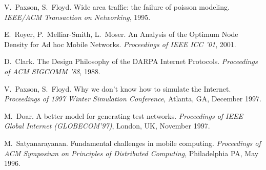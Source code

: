 \begin{thebibliography}{99}

V.~Paxson, S.~Floyd.
Wide area traffic: the failure of poisson modeling.
\textit{IEEE/ACM Transaction on Networking}, 1995.

E.~Royer, P.~Melliar-Smith, L.~Moser.
An Analysis of the Optimum Node Density for Ad hoc Mobile Networks.
\textit{Proceedings of IEEE ICC '01}, 2001.




D.~Clark.
The Design Philosophy of the DARPA Internet Protocols.
\textit{Proceedings of ACM SIGCOMM '88}, 1988.


V.~Paxson, S.~Floyd.
Why we don't know how to simulate the Internet.
\textit{Proceedings of 1997 Winter Simulation Conference}, Atlanta, GA, December 1997.




M.~Doar.
A better model for generating test networks.
\textit{Proceedings of IEEE Global Internet (GLOBECOM'97)}, London, UK, November 1997.
  
M.~Satyanarayanan.
Fundamental challenges in mobile computing.
\textit{Proceedings of ACM Symposium on Principles of Distributed Computing}, Philadelphia PA, May 1996.


\end{thebibliography}
